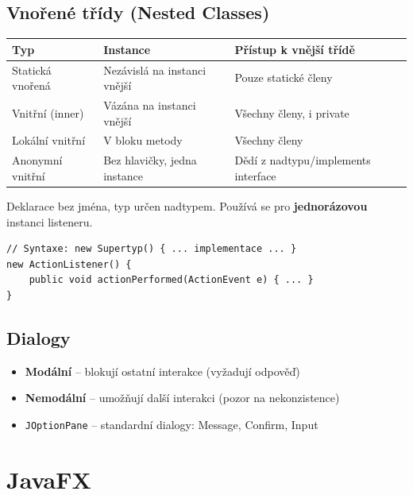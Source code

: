 \documentclass[11pt,a4paper]{article}
\begin{document}
\subsection{Vnořené třídy (Nested Classes)}

\begin{center}
\begin{tabular}{>{\raggedright}p{3cm} >{\raggedright}p{5cm} >{\raggedright\arraybackslash}p{5cm}}
\toprule
\textbf{Typ} & \textbf{Instance} & \textbf{Přístup k vnější třídě} \\
\midrule
Statická vnořená & Nezávislá na instanci vnější & Pouze statické členy \\
Vnitřní (inner) & Vázána na instanci vnější & Všechny členy, i private \\
Lokální vnitřní & V bloku metody & Všechny členy \\
Anonymní vnitřní & Bez hlavičky, jedna instance & Dědí z nadtypu/implements interface \\
\bottomrule
\end{tabular}
\end{center}

\begin{tcolorbox}[defbox,title=Anonymní vnitřní třída]
Deklarace bez jména, typ určen nadtypem. Používá se pro \textbf{jednorázovou} instanci listeneru.
\begin{verbatim}
// Syntaxe: new Supertyp() { ... implementace ... }
new ActionListener() {
    public void actionPerformed(ActionEvent e) { ... }
}
\end{verbatim}
\end{tcolorbox}

\subsection{Dialogy}

\begin{itemize}
    \item \textbf{Modální} -- blokují ostatní interakce (vyžadují odpověď)
    \item \textbf{Nemodální} -- umožňují další interakci (pozor na nekonzistence)
    \item \texttt{JOptionPane} -- standardní dialogy: Message, Confirm, Input
\end{itemize}

\section{JavaFX}
\end{document}
